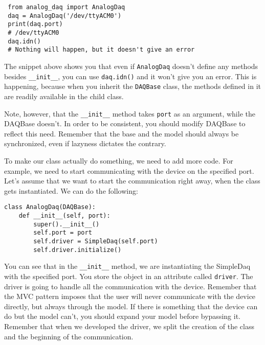 \begin{verbatim}
 from analog_daq import AnalogDaq
 daq = AnalogDaq('/dev/ttyACM0')
 print(daq.port)
 # /dev/ttyACM0
 daq.idn()
 # Nothing will happen, but it doesn't give an error
\end{verbatim}

The snippet above shows you that even if \texttt{AnalogDaq} doesn't define any methods besides \texttt{__init__}, you can use \texttt{daq.idn()} and it won't give you an error. This is happening, because when you inherit the \texttt{DAQBase} class, the methods defined in it are readily available in the child class. 

Note, however, that the \texttt{__init__} method takes \texttt{port} as an argument, while the DAQBase doesn't. In order to be consistent, you should modify DAQBase to reflect this need. Remember that the base and the model should always be synchronized, even if lazyness dictates the contrary. 


To make our class actually do something, we need to add more code. For example, we need to start communicating with the device on the specified port. Let's assume that we want to start the communication right away, when the class gets instantiated. We can do the following:

\begin{verbatim}
class AnalogDaq(DAQBase):
    def __init__(self, port):
        super().__init__()
        self.port = port
        self.driver = SimpleDaq(self.port)
        self.driver.initialize()
\end{verbatim}

You can see that in the \texttt{__init__} method, we are instantiating the SimpleDaq with the specified port. You store the
object in an attribute called \texttt{driver}. The driver is going to handle all the communication with the device. Remember that the {MVC} pattern imposes that the user will never communicate with the device directly, but always through the model. If there is something that the device can do but the model can't, you should expand your model before bypassing it. Remember that when we developed the driver, we split the creation of the class and the beginning of the communication. 


